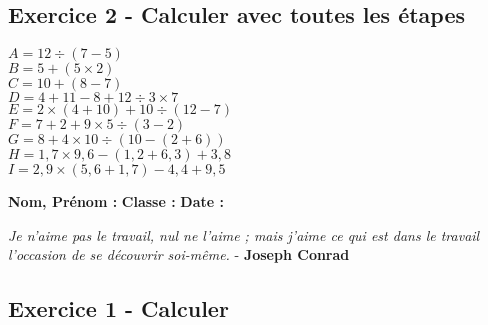 \documentclass[11pt]{article}
\begin{document}
\subsection*{Exercice 2 - Calculer avec toutes les étapes}

\begin{multicols}{3}
  \noindent
  $A = 12\div (7-5)$ \\
  $B = 5 + (5 \times 2)$ \\
  $C = 10+(8-7)$ \\
  $D = 4+11-8+12\div 3\times 7$ \\
  $E = 2\times (4+10)+10\div (12-7)$ \\
  $F = 7+2+9\times 5\div (3-2)$ \\
  $G = 8+4\times 10\div (10-(2+6))$ \\
  $H = 1{,}7\times 9{,}6-(1{,}2+6{,}3)+3{,}8$ \\
  $I = 2{,}9\times (5{,}6+1{,}7)-4{,}4+9{,}5$ 
\end{multicols}

\vspace{4cm}

\textbf{Nom, Prénom :} \hspace{8cm} \textbf{Classe :} \hspace{3cm} \textbf{Date :}\\
\vspace{-0.8cm}
\begin{center}
  \textit{Je n'aime pas le travail, nul ne l'aime ; mais j'aime ce qui est dans le travail l'occasion de se découvrir soi-même.}  - \textbf{Joseph Conrad}
\end{center}
\vspace{-0.8cm}

\subsection*{Exercice 1 - Calculer}
\end{document}
